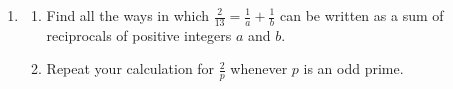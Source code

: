 \begin{exercises*}{}{}
\begin{enumerate}
		\item\begin{enumerate}
		  \item Find all the ways in which $\frac 2{13}=\frac 1a+\frac 1b$ can be written as a sum of reciprocals of positive integers $a$ and $b$.
		  \item Repeat your calculation for $\frac 2p$ whenever $p$ is an odd prime.
		\end{enumerate}
	\end{enumerate}
	
\end{exercises*}
